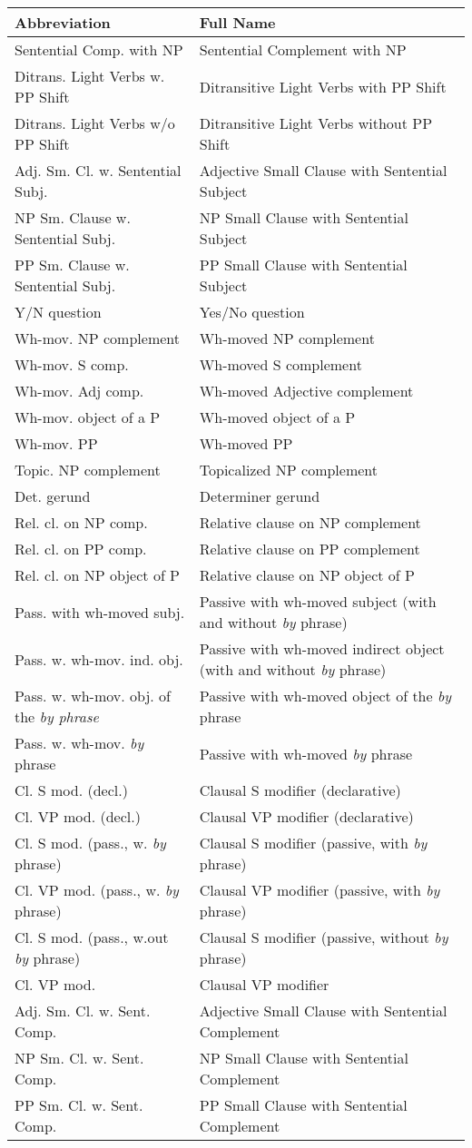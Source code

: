 \small
\begin{tabular}{ll}
Abbreviation&Full Name\\
\hline
Sentential Comp. with NP&Sentential Complement with NP\\
Ditrans. Light Verbs w. PP Shift&Ditransitive Light Verbs with PP Shift\\
Ditrans. Light Verbs w/o PP Shift&Ditransitive Light Verbs without PP Shift\\
Adj. Sm. Cl. w. Sentential Subj.&Adjective Small Clause with Sentential Subject\\
NP Sm. Clause w. Sentential Subj.&NP Small Clause with Sentential Subject\\
PP Sm. Clause w. Sentential Subj.&PP Small Clause with Sentential Subject\\
Y/N question&Yes/No question \\
Wh-mov. NP complement&Wh-moved NP complement \\
Wh-mov. S comp.&Wh-moved S complement \\
Wh-mov. Adj comp.&Wh-moved Adjective complement \\
Wh-mov. object of a P&Wh-moved object of a P \\
Wh-mov. PP&Wh-moved PP \\
Topic. NP complement&Topicalized NP complement \\
Det. gerund&Determiner gerund \\
Rel. cl. on NP comp.&Relative clause on NP complement \\
Rel. cl. on PP comp.& Relative clause on PP complement\\
Rel. cl. on NP object of P& Relative clause on NP object of P\\
Pass. with wh-moved subj.&Passive with wh-moved subject (with and without {\it by} phrase) \\
Pass. w. wh-mov. ind. obj.&Passive with wh-moved indirect object (with and without {\it by} phrase) \\
Pass. w. wh-mov. obj. of the {\it {\it by} phrase}&Passive with wh-moved object of the {\it by} phrase \\
Pass. w. wh-mov. {\it by} phrase&Passive with wh-moved {\it by} phrase \\
Cl. S mod. (decl.)&Clausal S modifier (declarative) \\
Cl. VP mod. (decl.)&Clausal VP modifier (declarative) \\
Cl. S mod. (pass., w. {\it by} phrase)&Clausal S modifier (passive, with {\it by} phrase) \\
Cl. VP mod. (pass., w. {\it by} phrase)&Clausal VP modifier (passive, with
{\it by} phrase)\\
Cl. S mod. (pass., w.out {\it by} phrase)&Clausal S modifier (passive, without
{\it by} phrase) \\
Cl. VP mod.&Clausal VP modifier\\
Adj. Sm. Cl. w. Sent. Comp.&Adjective Small Clause with Sentential
Complement\\
NP Sm. Cl. w. Sent. Comp.&NP Small Clause with Sentential Complement\\
PP Sm. Cl. w. Sent. Comp.&PP Small Clause with Sentential Complement\\
\end{tabular}
\normalsize




